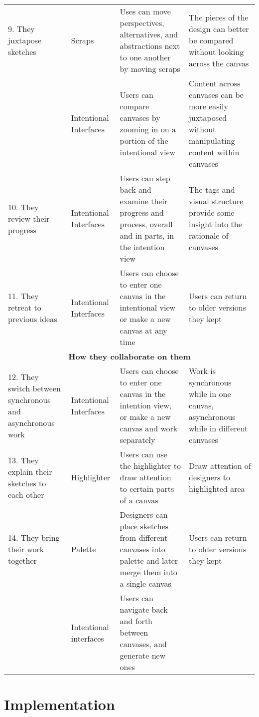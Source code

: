 \begin{center}
\begin{longtable}{|p{4cm}|p{4cm}|p{4cm}|p{4cm}|}
\hline
9.      They juxtapose sketches	&Scraps	&Uses can move perspectives, alternatives, and abstractions next to one another by moving scraps	&The pieces of the design can better be compared without looking across the canvas\\
\cline{2-4}
	&Intentional Interfaces	&Users can compare canvases by zooming in on a portion of the intentional view	&Content across canvases can be more easily juxtaposed without manipulating content within canvases\\
\hline
10.  They review their progress	&Intentional Interfaces	&Users can step back and examine their progress and process, overall and in parts, in the intention view	&The tags and visual structure provide some insight into the rationale of canvases\\
\hline
11.  They retreat to previous ideas	&Intentional Interfaces	&Users can choose to enter one canvas in the intentional view or make a new canvas at any time	&Users can return to older versions they kept\\
\hline
\multicolumn{4}{|c|}{\textbf{How they collaborate on them}}\\
\hline
12.  They switch between synchronous and asynchronous work	&Intentional Interfaces	&Users can choose to enter one canvas in the intention view, or make a new canvas and work separately	&Work is synchronous while in one canvas, asynchronous while in different canvases\\
\hline
13.  They explain their sketches to each other	&Highlighter	&Users can use the highlighter to draw attention to certain parts of a canvas	&Draw attention of designers to highlighted area\\
\hline
14.  They bring their work together	&Palette	&Designers can place sketches from different canvases into palette and later merge them into a single canvas		&Users can return to older versions they kept\\
\cline{2-3}
	&Intentional interfaces	&Users can navigate back and forth between canvases, and generate new ones&
\label{table:calico-version-two:designbehaviors}
\end{longtable}
\end{center}



\section{Implementation}
\label{chapter:calico-version-two:implementation}
    
